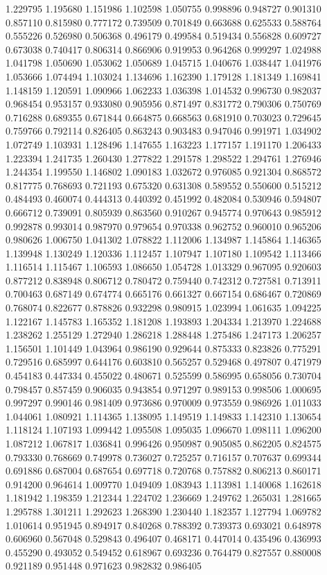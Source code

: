 1.229795
1.195680
1.151986
1.102598
1.050755
0.998896
0.948727
0.901310
0.857110
0.815980
0.777172
0.739509
0.701849
0.663688
0.625533
0.588764
0.555226
0.526980
0.506368
0.496179
0.499584
0.519434
0.556828
0.609727
0.673038
0.740417
0.806314
0.866906
0.919953
0.964268
0.999297
1.024988
1.041798
1.050690
1.053062
1.050689
1.045715
1.040676
1.038447
1.041976
1.053666
1.074494
1.103024
1.134696
1.162390
1.179128
1.181349
1.169841
1.148159
1.120591
1.090966
1.062233
1.036398
1.014532
0.996730
0.982037
0.968454
0.953157
0.933080
0.905956
0.871497
0.831772
0.790306
0.750769
0.716288
0.689355
0.671844
0.664875
0.668563
0.681910
0.703023
0.729645
0.759766
0.792114
0.826405
0.863243
0.903483
0.947046
0.991971
1.034902
1.072749
1.103931
1.128496
1.147655
1.163223
1.177157
1.191170
1.206433
1.223394
1.241735
1.260430
1.277822
1.291578
1.298522
1.294761
1.276946
1.244354
1.199550
1.146802
1.090183
1.032672
0.976085
0.921304
0.868572
0.817775
0.768693
0.721193
0.675320
0.631308
0.589552
0.550600
0.515212
0.484493
0.460074
0.444313
0.440392
0.451992
0.482084
0.530946
0.594807
0.666712
0.739091
0.805939
0.863560
0.910267
0.945774
0.970643
0.985912
0.992878
0.993014
0.987970
0.979654
0.970338
0.962752
0.960010
0.965206
0.980626
1.006750
1.041302
1.078822
1.112006
1.134987
1.145864
1.146365
1.139948
1.130249
1.120336
1.112457
1.107947
1.107180
1.109542
1.113466
1.116514
1.115467
1.106593
1.086650
1.054728
1.013329
0.967095
0.920603
0.877212
0.838948
0.806712
0.780472
0.759440
0.742312
0.727581
0.713911
0.700463
0.687149
0.674774
0.665176
0.661327
0.667154
0.686467
0.720869
0.768074
0.822677
0.878826
0.932298
0.980915
1.023994
1.061635
1.094225
1.122167
1.145783
1.165352
1.181208
1.193893
1.204334
1.213970
1.224688
1.238262
1.255129
1.272940
1.286218
1.288448
1.275486
1.247173
1.206257
1.156501
1.101449
1.043964
0.986190
0.929644
0.875333
0.823826
0.775291
0.729516
0.685997
0.644176
0.603810
0.565257
0.529468
0.497807
0.471979
0.454183
0.447334
0.455022
0.480671
0.525599
0.586995
0.658056
0.730704
0.798457
0.857459
0.906035
0.943854
0.971297
0.989153
0.998506
1.000695
0.997297
0.990146
0.981409
0.973686
0.970009
0.973559
0.986926
1.011033
1.044061
1.080921
1.114365
1.138095
1.149519
1.149833
1.142310
1.130654
1.118124
1.107193
1.099442
1.095508
1.095035
1.096670
1.098111
1.096200
1.087212
1.067817
1.036841
0.996426
0.950987
0.905085
0.862205
0.824575
0.793330
0.768669
0.749978
0.736027
0.725257
0.716157
0.707637
0.699344
0.691886
0.687004
0.687654
0.697718
0.720768
0.757882
0.806213
0.860171
0.914200
0.964614
1.009770
1.049409
1.083943
1.113981
1.140068
1.162618
1.181942
1.198359
1.212344
1.224702
1.236669
1.249762
1.265031
1.281665
1.295788
1.301211
1.292623
1.268390
1.230440
1.182357
1.127794
1.069782
1.010614
0.951945
0.894917
0.840268
0.788392
0.739373
0.693021
0.648978
0.606960
0.567048
0.529843
0.496407
0.468171
0.447014
0.435496
0.436993
0.455290
0.493052
0.549452
0.618967
0.693236
0.764479
0.827557
0.880008
0.921189
0.951448
0.971623
0.982832
0.986405
